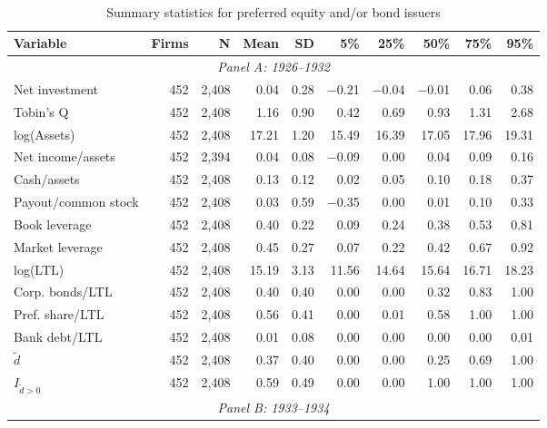 \begin{table}[p]\centering
    \caption{\\ Summary statistics for preferred equity and/or bond issuers}\scriptsize
    \label{tab:sum_pos}
    \begin{threeparttable}
        \begin{tabular}{lrrrrrrrrr}
            \toprule
            Variable & Firms & N & Mean & SD & 5\% & 25\% & 50\% & 75\% & 95\% \\
            \midrule
            \multicolumn{10}{c}{\textit{Panel A: 1926--1932}} \\
            \midrule
            Net investment & 452 & 2,408 & 0.04 & 0.28 & $-$0.21 & $-$0.04 & $-$0.01 & 0.06 & 0.38 \\
            Tobin's Q & 452 & 2,408 & 1.16 & 0.90 & 0.42 & 0.69 & 0.93 & 1.31 & 2.68 \\
            log(Assets) & 452 & 2,408 & 17.21 & 1.20 & 15.49 & 16.39 & 17.05 & 17.96 & 19.31 \\
            Net income/assets & 452 & 2,394 & 0.04 & 0.08 & $-$0.09 & 0.00 & 0.04 & 0.09 & 0.16 \\
            Cash/assets & 452 & 2,408 & 0.13 & 0.12 & 0.02 & 0.05 & 0.10 & 0.18 & 0.37 \\
            Payout/common stock & 452 & 2,408 & 0.03 & 0.59 & $-$0.35 & 0.00 & 0.01 & 0.10 & 0.33 \\
            Book leverage & 452 & 2,408 & 0.40 & 0.22 & 0.09 & 0.24 & 0.38 & 0.53 & 0.81 \\
            Market leverage & 452 & 2,408 & 0.45 & 0.27 & 0.07 & 0.22 & 0.42 & 0.67 & 0.92 \\
            log(LTL) & 452 & 2,408 & 15.19 & 3.13 & 11.56 & 14.64 & 15.64 & 16.71 & 18.23 \\
            Corp. bonds/LTL & 452 & 2,408 & 0.40 & 0.40 & 0.00 & 0.00 & 0.32 & 0.83 & 1.00 \\
            Pref. share/LTL & 452 & 2,408 & 0.56 & 0.41 & 0.00 & 0.01 & 0.58 & 1.00 & 1.00 \\
            Bank debt/LTL & 452 & 2,408 & 0.01 & 0.08 & 0.00 & 0.00 & 0.00 & 0.00 & 0.01 \\
            \ensuremath{\tilde{d}} & 452 & 2,408 & 0.37 & 0.40 & 0.00 & 0.00 & 0.25 & 0.69 & 1.00 \\
            \ensuremath{I_{\tilde{d}>0}} & 452 & 2,408 & 0.59 & 0.49 & 0.00 & 0.00 & 1.00 & 1.00 & 1.00 \\
            \midrule
            \multicolumn{10}{c}{\textit{Panel B: 1933--1934}} \\

\end{tabular}
\end{threeparttable}
\end{table}

